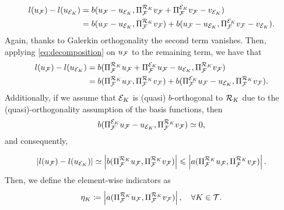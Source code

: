 {{{{{{{{{\begin{align}
  l(u_{\mathcal{F}})-l(u_{\mathcal{E}_K}) & =  b(u_{\mathcal{F}}-u_{\mathcal{E}_K},\Pi_{\mathcal{F}}^{\mathcal{R}_K} v_{\mathcal{F}}+\Pi_{\mathcal{F}}^{\mathcal{E}_K} v_{\mathcal{F}}-v_{\mathcal{E}_K})                        \\
                            & = b(u_{\mathcal{F}}-u_{\mathcal{E}_K},\Pi_{\mathcal{F}}^{\mathcal{R}_K} v_{\mathcal{F}})+b(u_{\mathcal{F}}-u_{\mathcal{E}_K},\Pi_{\mathcal{F}}^{\mathcal{E}_K} v_{\mathcal{F}}-v_{\mathcal{E}_K}).
\end{align}
Again, thanks to Galerkin orthogonality the second term vanishes. Then, applying \cref{eq:decomposition} on $u_{\mathcal{F}}$ to the remaining term, we have that
\begin{align}
  l(u_{\mathcal{F}})-l(u_{\mathcal{E}_K}) & =  b(\Pi_{\mathcal{F}}^{\mathcal{R}_K} u_{\mathcal{F}}+\Pi_{\mathcal{F}}^{\mathcal{E}_K}u_{\mathcal{F}}-u_{\mathcal{E}_K},\Pi_{\mathcal{F}}^{\mathcal{R}_K} v_{\mathcal{F}})                                   \\
                            & =b(\Pi_{\mathcal{F}}^{\mathcal{R}_K} u_{\mathcal{F}},\Pi_{\mathcal{F}}^{\mathcal{R}_K} v_{\mathcal{F}})+b(\Pi_{\mathcal{F}}^{\mathcal{E}_K}u_{\mathcal{F}}-u_{\mathcal{E}_K},\Pi_{\mathcal{F}}^{\mathcal{R}_K} v_{\mathcal{F}}).
\end{align}
Additionally, if we assume that $\mathcal{E}_K$ is (quasi) $b$-orthogonal to $\mathcal{R}_K$ due to the (quasi)-orthogonality assumption of the basis functions, then
\begin{equation}
  b(\Pi_{\mathcal{F}}^{\mathcal{E}_K} u_{\mathcal{F}}-u_{\mathcal{E}_K},\Pi_{\mathcal{F}}^{\mathcal{R}_K} v_{\mathcal{F}})\simeq 0,
\end{equation}
and consequently,

\begin{equation}
  \left|l(u_{\mathcal{F}})-l(u_{\mathcal{E}_K})\right| \simeq \left|b(\Pi_{\mathcal{F}}^{\mathcal{R}_K} u_{\mathcal{F}},\Pi_{\mathcal{F}}^{\mathcal{R}_K} v_{\mathcal{F}})\right|
  \leqslant  \left|a(\Pi_{\mathcal{F}}^{\mathcal{R}_K} u_{\mathcal{F}},\Pi_{\mathcal{F}}^{\mathcal{R}_K} v_{\mathcal{F}})\right|.
  \label{eq:UpperGOA}
\end{equation}
Then, we define the element-wise indicators as
\begin{equation}
  \eta_K \coloneqq \left|a(\Pi_{\mathcal{F}}^{\mathcal{R}_K} u_{\mathcal{F}},\Pi_{\mathcal{F}}^{\mathcal{R}_K} v_{\mathcal{F}})\right|, \quad \forall K\in \mathcal{T}.
  \label{eq:GOAupperbound}
\end{equation}

}}}}}}}}}
